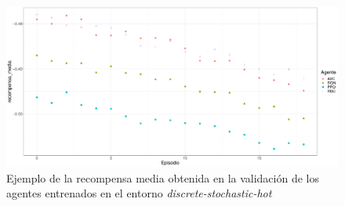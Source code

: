 \begin{table}
    \centering
    \caption{Recompensas medias obtenidas por los agentes entrenados en entornos continuos a lo largo de 20 episodios de validación}
    \label{tb:cont-stats}
\end{table}

\begin{figure}
    \centering
    \includegraphics[width=\textwidth]{imagenes/recompensa-disc-hot.pdf}
    \caption{Ejemplo de la recompensa media obtenida en la validación de los agentes entrenados en el entorno \textit{discrete-stochastic-hot}}
    \label{fig:recompensa-disc-hot}
\end{figure}

